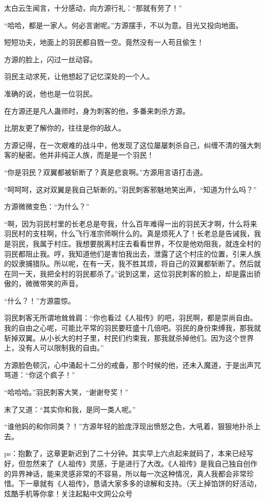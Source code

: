 \begin{this_body}
太白云生闻言，十分感动，向方源行礼：“那就有劳了！”

“哈哈，都是一家人。何必言谢呢。”方源摆手，不以为意。目光又投向地面。

短短功夫，地面上的羽民都自戮一空。竟然没有一人苟且偷生！

方源的脸上，闪过一丝动容。

羽民主动求死，让他想起了记忆深处的一个人。

准确的说，他也是一位羽民。

在方源还是凡人蛊师时，身为刺客的他，多番来刺杀方源。

比朋友更了解你的，往往是你的敌人。

方源记得，在一次艰难的战斗中，他发现了这位屡屡刺杀自己，纠缠不清的强大刺客的秘密。他并非纯正人族，而是是一个羽民！

“你是羽民？双翼都被斩断了？真是悲哀啊。”方源用言语打击道。

“呵呵呵，这对双翼是我自己斩断的。”羽民刺客邪魅地笑出声，“知道为什么吗？”

方源微微变色：“为什么？”

“啊，因为羽民村里的长老总是夸我，什么百年难得一出的羽民天才啊，什么将来羽民村的支柱啊，什么飞行准宗师啊什么的。真是烦死人了！长老总是告诫我，我是羽民，我属于村庄。我想要脱离村庄去看看世界，不仅是他劝阻我，就连全村的羽民都阻止我。哼，我知道他们是害怕我出去，泄露了这个村庄的位置，引来人族的奴隶捕猎队。所以呢，在有一天，我不胜其烦，将自己的双翼都斩断了。然后就在同一天，我把全村的羽民都杀了。”说到这里，这位羽民刺客的脸上，却是露出骄傲的，微微带笑的声音。

“什么？！”方源震惊。

羽民刺客无所谓地耸耸肩：“你也看过《人祖传》的吧，羽民啊，都是崇尚自由。我的自由之心呢，可能比平常的羽民要旺盛十几倍吧。羽民的身份束缚我，那我就斩掉双翼。从小长大的村子里，村民们约束我，那我就杀掉他们。因为这个世界上，没有人可以限制我的自由。”

方源脸色顿沉，心中涌起十二分的戒备，那个时候的他，还未入魔道，于是出声咒骂道：“你这个疯子！”

“哈哈哈。”羽民刺客大笑，“谢谢夸奖！”

末了又道：“其实你和我，是同一类人呢。”

“谁他妈的和你同类？！”方源年轻的脸庞浮现出愤怒之色，大吼着，狠狠地扑杀上去。

ps：抱歉了，这章更新迟到了二十分钟。其实早上六点起来就码了，本来已经写好，但忽然来了《人祖传》灵感，于是进行了大改。《人祖传》是我自己独自创作的异界神话，能来灵感非常的不容易，所以每一次这种情况，真人我都会非常珍惜。下一章就有《人祖传》，恳请大家多多的谅解和支持。（天上掉馅饼的好活动，炫酷手机等你拿！关注起點中文网公众号

\end{this_body}

